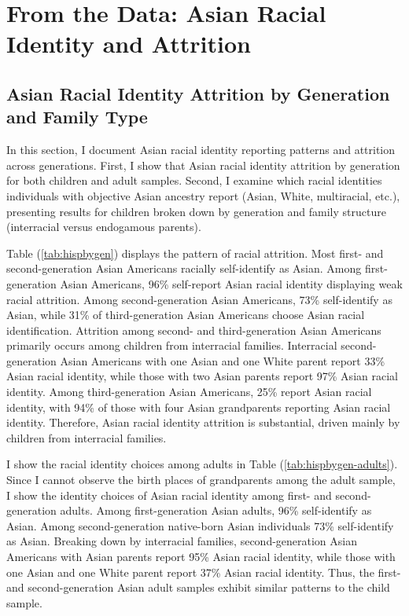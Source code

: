 \section{From the Data: Asian Racial Identity and Attrition}\label{sec:attrition}

\subsection{Asian Racial Identity Attrition by Generation and Family Type}

In this section, I document Asian racial identity reporting patterns and attrition across generations. First, I show that Asian racial identity attrition by generation for both children and adult samples. Second, I examine which racial identities individuals with objective Asian ancestry report (Asian, White, multiracial, etc.), presenting results for children broken down by generation and family structure (interracial versus endogamous parents).

Table (\ref{tab:hispbygen}) displays the pattern of racial attrition. Most first- and second-generation Asian Americans racially self-identify as Asian. Among first-generation Asian Americans, 96\% self-report Asian racial identity displaying weak racial attrition. Among second-generation Asian Americans, 73\% self-identify as Asian, while 31\% of third-generation Asian Americans choose Asian racial identification. Attrition among second- and third-generation Asian Americans primarily occurs among children from interracial families. Interracial second-generation Asian Americans with one Asian and one White parent report 33\% Asian racial identity, while those with two Asian parents report 97\% Asian racial identity. Among third-generation Asian Americans, 25\% report Asian racial identity, with 94\% of those with four Asian grandparents reporting Asian racial identity. Therefore, Asian racial identity attrition is substantial, driven mainly by children from interracial families.

I show the racial identity choices among adults in Table (\ref{tab:hispbygen-adults}). Since I cannot observe the birth places of grandparents among the adult sample, I show the identity choices of Asian racial identity among first- and second-generation adults. Among first-generation Asian adults, 96\% self-identify as Asian. Among second-generation native-born Asian individuals 73\%  self-identify as Asian. Breaking down by interracial families, second-generation Asian Americans with Asian parents report 95\% Asian racial identity, while those with one Asian and one White parent report 37\% Asian racial identity. Thus, the first- and second-generation Asian adult samples exhibit similar patterns to the child sample.

